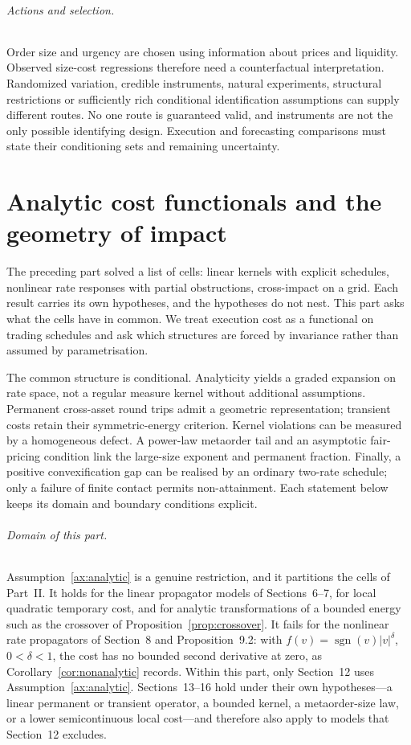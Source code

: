 \documentclass[11pt]{article}
\numberwithin{equation}{section}
\theoremstyle{definition}
\theoremstyle{remark}
\theoremstyle{definition}
\begin{document}
\paragraph{Actions and selection.}
Order size and urgency are chosen using information about prices and liquidity.
Observed size-cost regressions therefore need a counterfactual interpretation.
Randomized variation, credible instruments, natural experiments, structural
restrictions or sufficiently rich conditional identification assumptions can
supply different routes. No one route is guaranteed valid, and instruments are
not the only possible identifying design. Execution and forecasting comparisons
must state their conditioning sets and remaining uncertainty.

\part{Analytic cost functionals and the geometry of impact}\label{pt:general}

The preceding part solved a list of cells: linear kernels with explicit
schedules, nonlinear rate responses with partial obstructions, cross-impact on a
grid. Each result carries its own hypotheses, and the hypotheses do not nest.
This part asks what the cells have in common. We treat execution cost as a
functional on trading schedules and ask which structures are forced by
invariance rather than assumed by parametrisation.

The common structure is conditional. Analyticity yields a graded expansion
on rate space, not a regular measure kernel without additional assumptions.
Permanent cross-asset round trips admit a geometric representation; transient
costs retain their symmetric-energy criterion. Kernel violations can be
measured by a homogeneous defect. A power-law metaorder tail and an asymptotic
fair-pricing condition link the large-size exponent and permanent fraction.
Finally, a positive convexification gap can be realised by an ordinary
two-rate schedule; only a failure of finite contact permits non-attainment.
Each statement below keeps its domain and boundary conditions explicit.

\paragraph{Domain of this part.}
Assumption~\ref{ax:analytic} is a genuine restriction, and it partitions the
cells of Part~II. It holds for the linear propagator models of Sections~6--7,
for local quadratic temporary cost, and for analytic transformations of a
bounded energy such as the crossover of Proposition~\ref{prop:crossover}. It
fails for the nonlinear rate propagators of Section~8 and
Proposition~9.2: with $f(v)=\operatorname{sgn}(v)\lvert v\rvert^{\delta}$,
$0<\delta<1$, the cost has no bounded second derivative at zero, as
Corollary~\ref{cor:nonanalytic} records. Within this part, only Section~12 uses
Assumption~\ref{ax:analytic}. Sections~13--16 hold under their own
hypotheses---a linear permanent or transient operator, a bounded kernel, a
metaorder-size law, or a lower semicontinuous local cost---and therefore also
apply to models that Section~12 excludes.
\end{document}
